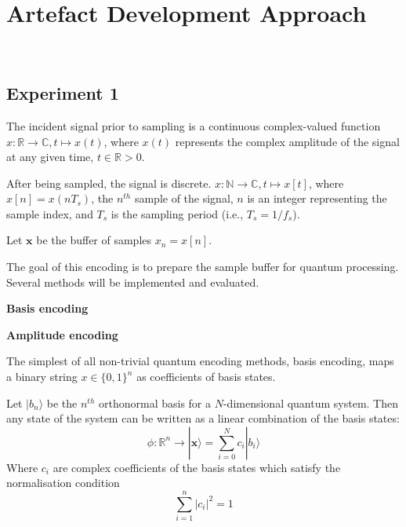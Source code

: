 \section{Artefact Development Approach}~\label{sec:approach}

\subsection{Experiment 1}

The incident signal prior to sampling is a continuous complex-valued function
$x : \mathbb{R} \rightarrow \mathbb{C}, t \mapsto x(t)$,
where $x(t)$ represents the complex amplitude of the signal at any given time, $t \in \mathbb{R} > 0$.

After being sampled, the signal is discrete.
$x : \mathbb{N} \rightarrow \mathbb{C}, t \mapsto x[t]$,
where $x[n] = x(n T_s)$, the $n^{th}$ sample of the signal, $n$ is an integer representing the sample index, and $T_s$ is the sampling period (i.e., $T_s = 1/f_s$).

Let $\mathbf{x}$ be the buffer of samples $x_n=x[n]$.

The goal of this encoding is to prepare the sample buffer for quantum processing.
Several methods will be implemented and evaluated.

\textbf{Basis encoding}

\textbf{Amplitude encoding}

The simplest of all non-trivial quantum encoding methods, basis encoding, maps a binary string $x \in {\{0,1\}}^n$ as coefficients of basis states.

Let $\vert b_n \rangle$ be the $n^{th}$ orthonormal basis for a $N$-dimensional quantum system.
Then any state of the system can be written as a linear combination of the basis states:
\begin{equation}
    \displaystyle{
        \phi: \mathbb{R}^n \rightarrow | \mathbf{x} \rangle =
        \sum_{i=0}^{N}
            c_i | b_i \rangle
    }
\end{equation}
Where $c_i$ are complex coefficients of the basis states which satisfy the normalisation condition
\begin{equation}
    \displaystyle{\sum_{i=1}^n |c_i|^2 = 1}
\end{equation}

